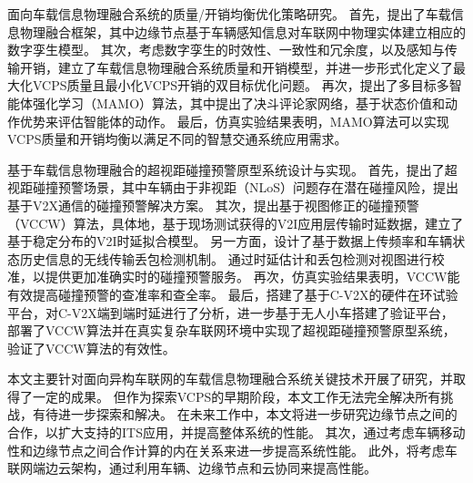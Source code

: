  面向车载信息物理融合系统的质量/开销均衡优化策略研究。
首先，提出了车载信息物理融合框架，其中边缘节点基于车辆感知信息对车联网中物理实体建立相应的数字孪生模型。
其次，考虑数字孪生的时效性、一致性和冗余度，以及感知与传输开销，建立了车载信息物理融合系统质量和开销模型，并进一步形式化定义了最大化VCPS质量且最小化VCPS开销的双目标优化问题。
再次，提出了多目标多智能体强化学习（MAMO）算法，其中提出了决斗评论家网络，基于状态价值和动作优势来评估智能体的动作。
最后，仿真实验结果表明，MAMO算法可以实现VCPS质量和开销均衡以满足不同的智慧交通系统应用需求。

 基于车载信息物理融合的超视距碰撞预警原型系统设计与实现。
首先，提出了超视距碰撞预警场景，其中车辆由于非视距（NLoS）问题存在潜在碰撞风险，提出基于V2X通信的碰撞预警解决方案。
其次，提出基于视图修正的碰撞预警（VCCW）算法，具体地，基于现场测试获得的V2I应用层传输时延数据，建立了基于稳定分布的V2I时延拟合模型。
另一方面，设计了基于数据上传频率和车辆状态历史信息的无线传输丢包检测机制。
通过时延估计和丢包检测对视图进行校准，以提供更加准确实时的碰撞预警服务。
再次，仿真实验结果表明，VCCW能有效提高碰撞预警的查准率和查全率。
最后，搭建了基于C-V2X的硬件在环试验平台，对C-V2X端到端时延进行了分析，进一步基于无人小车搭建了验证平台，部署了VCCW算法并在真实复杂车联网环境中实现了超视距碰撞预警原型系统，验证了VCCW算法的有效性。

本文主要针对面向异构车联网的车载信息物理融合系统关键技术开展了研究，并取得了一定的成果。
但作为探索VCPS的早期阶段，本文工作无法完全解决所有挑战，有待进一步探索和解决。
在未来工作中，本文将进一步研究边缘节点之间的合作，以扩大支持的ITS应用，并提高整体系统的性能。
其次，通过考虑车辆移动性和边缘节点之间合作计算的内在关系来进一步提高系统性能。
此外，将考虑车联网端边云架构，通过利用车辆、边缘节点和云协同来提高性能。
